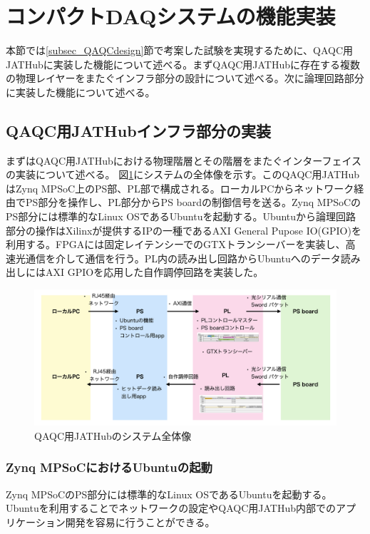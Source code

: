 \section{コンパクトDAQシステムの機能実装}
本節では\ref{subsec_QAQCdesign}節で考案した試験を実現するために、QAQC用JATHubに実装した機能について述べる。まずQAQC用JATHubに存在する複数の物理レイヤーをまたぐインフラ部分の設計について述べる。次に論理回路部分に実装した機能について述べる。

\subsection{QAQC用JATHubインフラ部分の実装}
\label{subsec_infra}
まずはQAQC用JATHubにおける物理階層とその階層をまたぐインターフェイスの実装について述べる。
図\ref{JAThubinfra}にシステムの全体像を示す。このQAQC用JATHubはZynq MPSoC上のPS部、PL部で構成される。ローカルPCからネットワーク経由でPS部分を操作し、PL部分からPS boardの制御信号を送る。Zynq MPSoCのPS部分には標準的なLinux OSであるUbuntuを起動する。Ubuntuから論理回路部分の操作はXilinxが提供するIPの一種であるAXI General Pupose IO(GPIO)を利用する。FPGAには固定レイテンシーでのGTXトランシーバーを実装し、高速光通信を介して通信を行う。PL内の読み出し回路からUbuntuへのデータ読み出しにはAXI GPIOを応用した自作調停回路を実装した。

\begin{figure} 
\centering
\includegraphics[width=16cm]{fig/JAThubinfra.png}
\caption[QAQC用JATHubのシステム全体像]{QAQC用JATHubのシステム全体像}
\label{JAThubinfra}
\end{figure}

\subsubsection{Zynq MPSoCにおけるUbuntuの起動}
\label{subsubsec_ubuntu}
\baselineskip
Zynq MPSoCのPS部分には標準的なLinux OSであるUbuntuを起動する。Ubuntuを利用することでネットワークの設定やQAQC用JATHub内部でのアプリケーション開発を容易に行うことができる。\par

